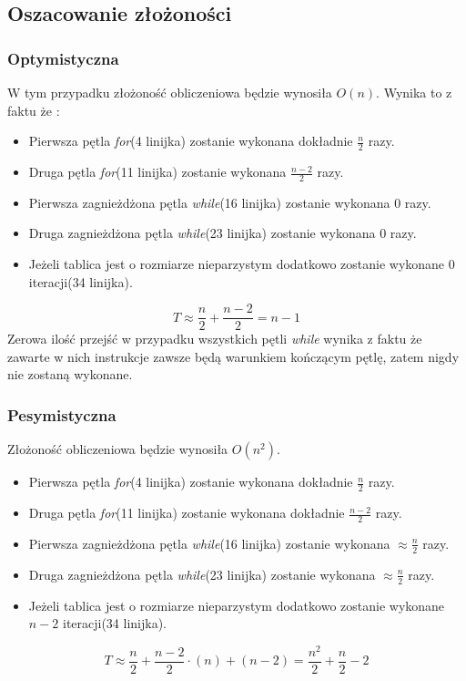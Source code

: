 \subsection*{Oszacowanie złożoności}
\subsubsection*{Optymistyczna}
W tym przypadku złożoność obliczeniowa będzie wynosiła $O(n)$.
Wynika to z faktu że :
\begin{itemize}
\item   Pierwsza pętla \textit{for}(4 linijka) zostanie wykonana dokładnie $\frac{n}{2}$ razy.
\item Druga pętla \textit{for}(11 linijka) zostanie wykonana $\frac{n-2}{2}$ razy.
\item Pierwsza zagnieżdżona pętla \textit{while}(16 linijka) zostanie wykonana $0$ razy.
\item Druga zagnieżdżona pętla \textit{while}(23 linijka) zostanie wykonana $0$ razy.
\item Jeżeli tablica jest o rozmiarze nieparzystym dodatkowo zostanie wykonane $0$ iteracji(34 linijka).
\end{itemize}
\begin{equation}
T \approx \frac{n}{2} + \frac{n-2}{2} = n-1
\end{equation}
\wyjT
Zerowa ilość przejść w przypadku wszystkich pętli \textit{while} wynika z faktu że zawarte w nich instrukcje zawsze będą warunkiem kończącym pętlę, zatem nigdy nie zostaną wykonane.

\subsubsection*{Pesymistyczna}
Złożoność obliczeniowa będzie wynosiła $O(n^2)$.
\begin{itemize}
\item Pierwsza pętla \textit{for}(4 linijka) zostanie wykonana dokładnie $\frac{n}{2}$ razy.
\item Druga pętla \textit{for}(11 linijka) zostanie wykonana dokładnie $\frac{n-2}{2}$ razy.
\item Pierwsza zagnieżdżona pętla \textit{while}(16 linijka) zostanie wykonana $\approx \frac{n}{2}$ razy.
\item Druga zagnieżdżona pętla \textit{while}(23 linijka) zostanie wykonana $\approx \frac{n}{2}$ razy.
\item Jeżeli tablica jest o rozmiarze nieparzystym dodatkowo zostanie wykonane $n-2$ iteracji(34 linijka).
\end{itemize}
\begin{equation*}
T \approx \frac{n}{2} + \frac{n-2}{2}\cdot(n)+ (n-2)= \frac{n^2}{2} + \frac{n}{2} -2
\end{equation*}
\wyjT

